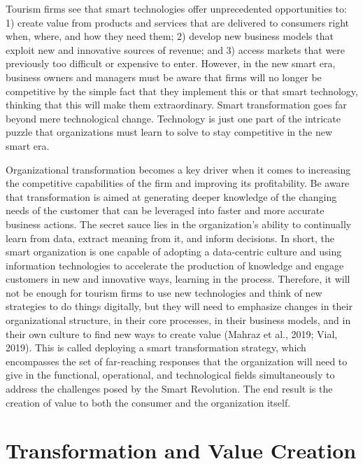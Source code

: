 \documentclass[
  letterpaper,
  DIV=11,
  numbers=noendperiod]{scrreprt}
\begin{document}
Tourism firms see that smart technologies offer unprecedented
opportunities to: 1) create value from products and services that are
delivered to consumers right when, where, and how they need them; 2)
develop new business models that exploit new and innovative sources of
revenue; and 3) access markets that were previously too difficult or
expensive to enter. However, in the new smart era, business owners and
managers must be aware that firms will no longer be competitive by the
simple fact that they implement this or that smart technology, thinking
that this will make them extraordinary. Smart transformation goes far
beyond mere technological change. Technology is just one part of the
intricate puzzle that organizations must learn to solve to stay
competitive in the new smart era.

Organizational transformation becomes a key driver when it comes to
increasing the competitive capabilities of the firm and improving its
profitability. Be aware that transformation is aimed at generating
deeper knowledge of the changing needs of the customer that can be
leveraged into faster and more accurate business actions. The secret
sauce lies in the organization's ability to continually learn from data,
extract meaning from it, and inform decisions. In short, the smart
organization is one capable of adopting a data-centric culture and using
information technologies to accelerate the production of knowledge and
engage customers in new and innovative ways, learning in the process.
Therefore, it will not be enough for tourism firms to use new
technologies and think of new strategies to do things digitally, but
they will need to emphasize changes in their organizational structure,
in their core processes, in their business models, and in their own
culture to find new ways to create value (Mahraz et al., 2019; Vial,
2019). This is called deploying a smart transformation strategy, which
encompasses the set of far-reaching responses that the organization will
need to give in the functional, operational, and technological fields
simultaneously to address the challenges posed by the Smart Revolution.
The end result is the creation of value to both the consumer and the
organization itself.

\hypertarget{transformation-and-value-creation}{%
\section{Transformation and Value
Creation}\label{transformation-and-value-creation}}
\end{document}
